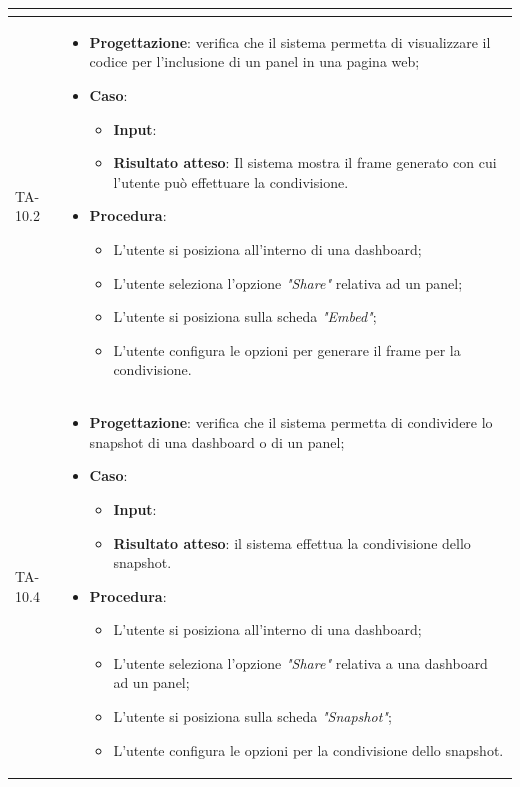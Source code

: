 \begin{longtable}{|C{2.5cm}|C{13cm}|}
\begin{itemize}
\begin{itemize}
	\end{itemize} 
\end{itemize}\\
\hline
{TA-10.2} &
\begin{itemize}
	\item \textbf{Progettazione}: verifica che il sistema permetta di visualizzare il codice per l'inclusione di un panel in una pagina web;
	\item \textbf{Caso}: 
	\begin{itemize}
		\item \textbf{Input}: 
		\item \textbf{Risultato atteso}: Il sistema mostra il frame generato con cui l'utente può effettuare la condivisione.
	\end{itemize}
	\item \textbf{Procedura}:
	\begin{itemize}
		\item L'utente si posiziona all'interno di una dashboard;
		\item L'utente seleziona l'opzione \emph{"Share"} relativa ad un panel;
		\item L'utente si posiziona sulla scheda \emph{"Embed"};
		\item L'utente configura le opzioni per generare il frame per la condivisione.
	\end{itemize} 
\end{itemize}\\
\hline
{TA-10.4} &
\begin{itemize}
	\item \textbf{Progettazione}: verifica che il sistema permetta di condividere lo snapshot di una dashboard o di un
	panel;
	\item \textbf{Caso}: 
	\begin{itemize}
		\item \textbf{Input}: 
		\item \textbf{Risultato atteso}: il sistema effettua la condivisione dello snapshot.
	\end{itemize}
	\item \textbf{Procedura}:
	\begin{itemize}
		\item L'utente si posiziona all'interno di una dashboard;
		\item L'utente seleziona l'opzione \emph{"Share"} relativa a una dashboard ad un panel;
		\item L'utente si posiziona sulla scheda \emph{"Snapshot"};
		\item L'utente configura le opzioni per la condivisione dello snapshot.

\end{itemize}
\end{itemize}
\end{longtable}
